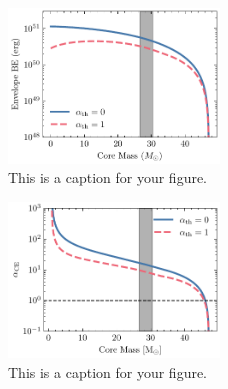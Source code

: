 \documentclass[linenumbers,trackchanges,twocolumn]{aastex701}
\begin{document}
\begin{figure}[htbp]
    \centering
    \includegraphics[width=0.5\textwidth]{xrb_be.pdf}
    \caption{This is a caption for your figure.}
    \label{fig:xrb_be}
\end{figure}

\begin{figure}[htbp]
    \centering
    \includegraphics[width=0.5\textwidth]{xrb_alpha_ce.pdf}
    \caption{This is a caption for your figure.}
    \label{fig:xrb_alpha_ce}
\end{figure}
\end{document}
